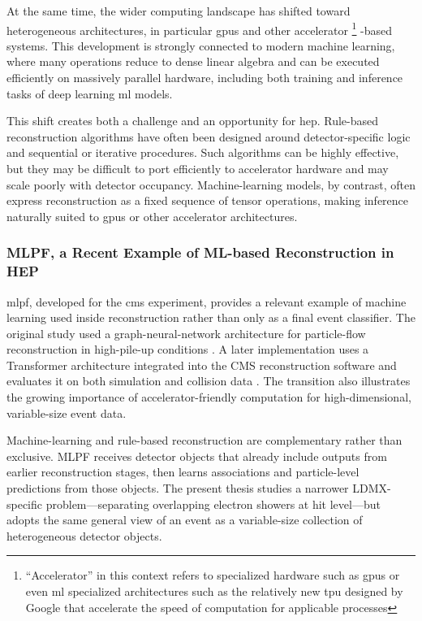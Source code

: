 At the same time, the wider computing landscape has shifted toward heterogeneous architectures, in particular \glspl{gpu} and other accelerator \footnote{``Accelerator'' in this context refers to specialized hardware such as \glspl{gpu} or even \gls{ml} specialized architectures such as the relatively new \gls{tpu} designed by Google that accelerate the speed of computation for applicable processes\cite{needed}}
-based systems. This development is strongly connected to modern machine learning, where many operations reduce to dense linear algebra and can be executed efficiently on massively parallel hardware, including both training and inference tasks of deep learning \gls{ml} models.

This shift creates both a challenge and an opportunity for \gls{hep}. Rule-based reconstruction algorithms have often been designed around detector-specific logic and sequential or iterative procedures. Such algorithms can be highly effective, but they may be difficult to port efficiently to accelerator hardware and may scale poorly with detector occupancy. Machine-learning models, by contrast, often express reconstruction as a fixed sequence of tensor operations, making inference naturally suited to \glspl{gpu} or other accelerator architectures. 

\subsubsection{MLPF, a Recent Example of ML-based Reconstruction in HEP}

\gls{mlpf}, developed for the \gls{cms} experiment, provides a relevant
example of machine learning used inside reconstruction rather than only as a
final event classifier. The original study used a graph-neural-network
architecture for particle-flow reconstruction in high-pile-up conditions
\cite{pata2021-mlpf}. A later implementation uses a Transformer architecture
integrated into the CMS reconstruction software and evaluates it on both
simulation and collision data \cite{pata2026-mlpf}. The transition also
illustrates the growing importance of accelerator-friendly computation for
high-dimensional, variable-size event data.

Machine-learning and rule-based reconstruction are complementary rather than
exclusive. MLPF receives detector objects that already include outputs from
earlier reconstruction stages, then learns associations and particle-level
predictions from those objects. The present thesis studies a narrower
LDMX-specific problem---separating overlapping electron showers at hit
level---but adopts the same general view of an event as a variable-size
collection of heterogeneous detector objects.


